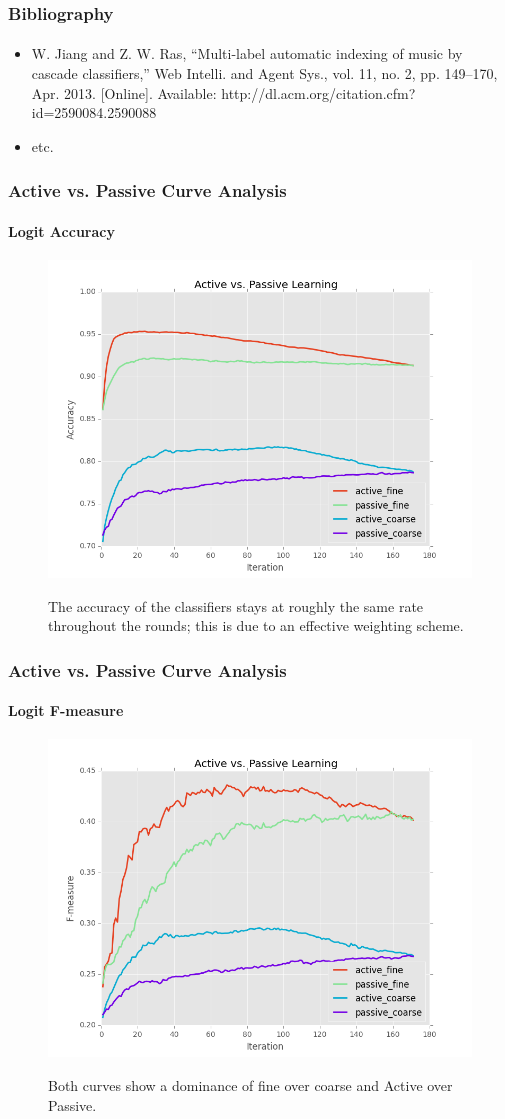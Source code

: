 \documentclass{beamer}
\begin{document}
\begin{frame}
    \frametitle{Bibliography}
    \framesubtitle{}
    \begin{itemize}
      \item W. Jiang and Z. W. Ras, “Multi-label automatic indexing of music by cascade classifiers,” Web Intelli. and Agent Sys., vol. 11, no. 2, pp. 149–170, Apr. 2013. [Online]. Available: http://dl.acm.org/citation.cfm?id=2590084.2590088
      \item etc.
    \end{itemize}
\end{frame}

\begin{frame}
    \frametitle{Active vs. Passive Curve Analysis}
    \framesubtitle{Logit Accuracy}
    \begin{figure}[!htb]
        \centering
        \includegraphics[width=0.80\columnwidth]{fig/runActPassLogReg_acc}
        \label{fig:runActPassLogReg_acc}
        \caption{The accuracy of the classifiers stays at
roughly the same rate throughout the rounds; this is due to an effective
weighting scheme.}
    \end{figure}
\end{frame}
\begin{frame}
    \frametitle{Active vs. Passive Curve Analysis}
    \framesubtitle{Logit F-measure}
    \begin{figure}[!htb]
        \centering
        \includegraphics[width=0.70\columnwidth]{fig/runActPassLogReg_f1}
        \label{fig:runActPassLogReg_f1}
        \caption{Both curves show a dominance of fine over coarse and
Active over Passive.}
    \end{figure}
\end{frame}
\end{document}
